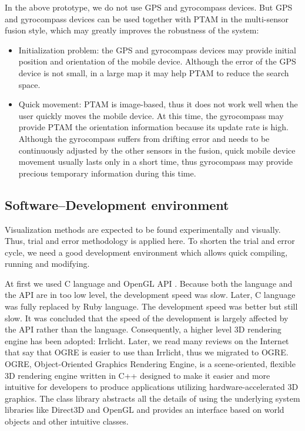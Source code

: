 In the above prototype, we do not use GPS and gyrocompass devices. But GPS and gyrocompass devices can be used together with PTAM in the multi-sensor fusion \citep{Reference14} style, which may greatly improves the robustness of the system:

\begin{itemize}
	\item Initialization problem: the GPS and gyrocompass devices may provide initial position and orientation of the mobile device. Although the error of the GPS device is not small, in a large map it may help PTAM to reduce the search space.
	\item Quick movement: PTAM is image-based, thus it does not work well when the user quickly moves the mobile device. At this time, the gyrocompass may provide PTAM the orientation information because its update rate is high. Although the gyrocompass suffers from drifting error and needs to be continuously adjusted by the other sensors in the fusion, quick mobile device movement usually lasts only in a short time, thus gyrocompass may provide precious temporary information during this time.
\end{itemize}

\subsection{Software--Development environment}

Visualization methods are expected to be found experimentally and visually. Thus, trial and error methodology is applied here. To shorten the trial and error cycle, we need a good development environment which allows quick compiling, running and modifying.

At first we used C language and OpenGL API \citep{Reference10}. Because both the language and the API are in too low level, the development speed was slow. Later, C language was fully replaced by Ruby language. The development speed was better but still slow. It was concluded that the speed of the development is largely affected by the API rather than the language. Consequently, a higher level 3D rendering engine has been adopted: Irrlicht. Later, we read many reviews on the Internet that say that OGRE \citep{Reference11} is easier to use than Irrlicht, thus we migrated to OGRE. OGRE, Object-Oriented Graphics Rendering Engine, is a scene-oriented, flexible 3D rendering engine written in C++ designed to make it easier and more intuitive for developers to produce applications utilizing hardware-accelerated 3D graphics. The class library abstracts all the details of using the underlying system libraries like Direct3D and OpenGL and provides an interface based on world objects and other intuitive classes.


